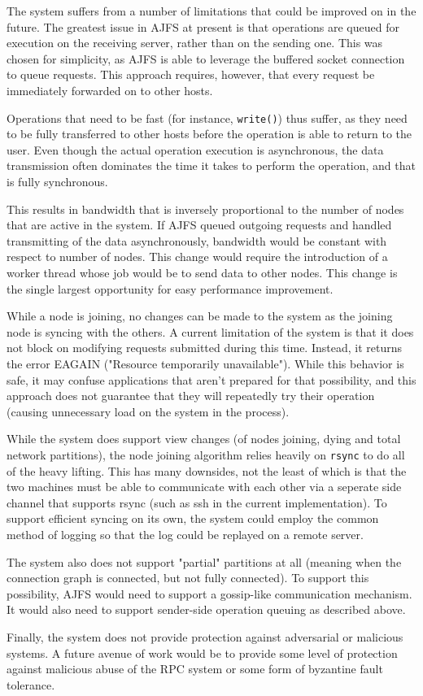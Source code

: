 
The system suffers from a number of limitations that could be improved on in the
future. The greatest issue in AJFS at present is that operations are queued for
execution on the receiving server, rather than on the sending one. This was
chosen for simplicity, as AJFS is able to leverage the buffered socket
connection to queue requests. This approach requires, however, that every
request be immediately forwarded on to other hosts.

Operations that need to be fast (for instance, \texttt{write()}) thus suffer, as
they need to be fully transferred to other hosts before the operation is able to
return to the user. Even though the actual operation execution is asynchronous,
the data transmission often dominates the time it takes to perform the
operation, and that is fully synchronous.

This results in bandwidth that is inversely proportional to the number of nodes
that are active in the system. If AJFS queued outgoing requests and handled
transmitting of the data asynchronously, bandwidth would be constant with
respect to number of nodes. This change would require the introduction of a
worker thread whose job would be to send data to other nodes. This change is
the single largest opportunity for easy performance improvement.

While a node is joining, no changes can be made to the system as the joining
node is syncing with the others. A current limitation of the system is that it
does not block on modifying requests submitted during this time. Instead, it
returns the error EAGAIN ("Resource temporarily unavailable"). While this
behavior is safe, it may confuse applications that aren't prepared for that
possibility, and this approach does not guarantee that they will repeatedly try
their operation (causing unnecessary load on the system in the process).

While the system does support view changes (of nodes joining, dying and total
network partitions), the node joining algorithm relies heavily on \texttt{rsync}
to do all of the heavy lifting. This has many downsides, not the least of which
is that the two machines must be able to communicate with each other via a
seperate side channel that supports rsync (such as ssh in the current
implementation). To support efficient syncing on its own, the system could
employ the common method of logging so that the log could be replayed on a
remote server.

The system also does not support "partial" partitions at all (meaning when
the connection graph is connected, but not fully connected). To support this
possibility, AJFS would need to support a gossip-like communication mechanism.
It would also need to support sender-side operation queuing as described above.

Finally, the system does not provide protection against adversarial or malicious
systems. A future avenue of work would be to provide some level of protection
against malicious abuse of the RPC system or some form of byzantine fault
tolerance.
